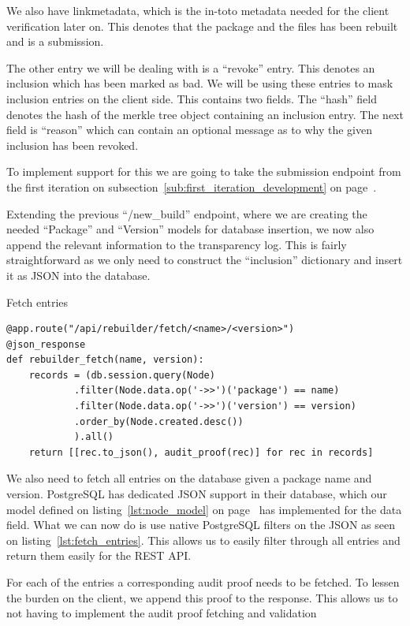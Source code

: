 \documentclass[../Main/thesis.tex]{subfiles}
\begin{document}
We also have linkmetadata, which is the in-toto metadata needed for the client
verification later on. This denotes that the package and the files has been
rebuilt and is a submission.

The other entry we will be dealing with is a ``revoke'' entry. This denotes an
inclusion which has been marked as bad. We will be using these entries to mask
inclusion entries on the client side. This contains two fields. The ``hash''
field denotes the hash of the merkle tree object containing an inclusion entry.
The next field is ``reason'' which can contain an optional message as to why the
given inclusion has been revoked.

To implement support for this we are going to take the submission endpoint from
the first iteration on subsection~\ref{sub:first_iteration_development} on
page~\pageref{sub:first_iteration_development}.

Extending the previous ``/new\_build'' endpoint, where we are creating the
needed ``Package'' and ``Version'' models for database insertion, we now also
append the relevant information to the transparency log. This is fairly
straightforward as we only need to construct the ``inclusion'' dictionary and
insert it as JSON into the database.

\begin{listing}[H]
\caption{Fetch entries}
\label{lst:fetch_entries}
\begin{verbatim}
@app.route("/api/rebuilder/fetch/<name>/<version>")
@json_response
def rebuilder_fetch(name, version):
    records = (db.session.query(Node)
            .filter(Node.data.op('->>')('package') == name)
            .filter(Node.data.op('->>')('version') == version)
            .order_by(Node.created.desc())
            ).all()
    return [[rec.to_json(), audit_proof(rec)] for rec in records]
\end{verbatim}
\end{listing}

We also need to fetch all entries on the database given a package name and
version. PostgreSQL has dedicated JSON support in their database, which our
model defined on listing~\ref{lst:node_model} on page~\pageref{lst:node_model}
has implemented for the data field. What we can now do is use native PostgreSQL
filters on the JSON as seen on listing~\ref{lst:fetch_entries}. This allows us
to easily filter through all entries and return them easily for the REST API.

For each of the entries a corresponding audit proof needs to be fetched. To
lessen the burden on the client, we append this proof to the response. This
allows us to not having to implement the audit proof fetching and validation 
\end{document}

